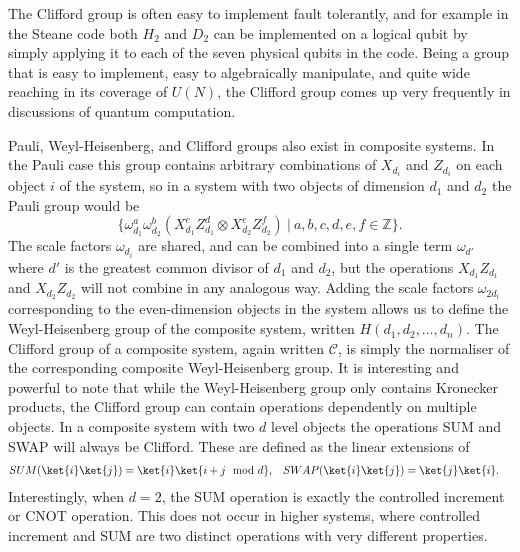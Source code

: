 The Clifford group is often easy to implement fault tolerantly, and for example in the Steane code \cite{steane-code} both $H_2$ and $D_2$ can be implemented on a logical qubit by simply applying it to each of the seven physical qubits in the code. Being a group that is easy to implement, easy to algebraically manipulate, and quite wide reaching in its coverage of $U(N)$, the Clifford group comes up very frequently in discussions of quantum computation.

Pauli, Weyl-Heisenberg, and Clifford groups also exist in composite systems. In the Pauli case this group contains arbitrary combinations of $X_{d_i}$ and $Z_{d_i}$ on each object $i$ of the system, so in a system with two objects of dimension $d_1$ and $d_2$ the Pauli group would be
\[\{\omega_{d_1}^a\omega_{d_2}^b(X_{d_1}^cZ_{d_1}^d\otimes X_{d_2}^eZ_{d_2}^f)\ |\ a, b, c, d, e, f \in \mathbb{Z}\}.\]
The scale factors $\omega_{d_i}$ are shared, and can be combined into a single term $\omega_{d'}$ where $d'$ is the greatest common divisor of $d_1$ and $d_2$, but the operations $X_{d_1}Z_{d_1}$ and $X_{d_2}Z_{d_2}$ will not combine in any analogous way. Adding the scale factors $\omega_{2d_i}$ corresponding to the even-dimension objects in the system allows us to define the Weyl-Heisenberg group of the composite system, written $H(d_1, d_2, \dots, d_n)$. The Clifford group of a composite system, again written $\mathcal{C}$, is simply the normaliser of the corresponding composite Weyl-Heisenberg group. It is interesting and powerful to note that while the Weyl-Heisenberg group only contains Kronecker products, the Clifford group can contain operations dependently on multiple objects. In a composite system with two $d$ level objects the operations SUM and SWAP will always be Clifford. These are defined as the linear extensions of
\begin{align*}
	SUM(\ket{i}\ket{j}) = \ket{i}\ket{i+j \mod d}, &&& SWAP(\ket{i}\ket{j}) = \ket{j}\ket{i}.
\end{align*}
Interestingly, when $d=2$, the SUM operation is exactly the controlled increment or CNOT operation. This does not occur in higher systems, where controlled increment and SUM are two distinct operations with very different properties.

